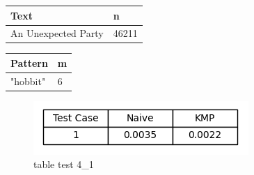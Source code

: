 \documentclass[11pt]{article}
\begin{document}
                \begin{table}[!htb]
                        \begin{minipage}{.5\linewidth}
                            \centering
                                \begin{tabular}{ll}
                                    \textbf{Text} & \textbf{n} \\
                                    \hline
                                    An Unexpected Party & 46211 \\
                                \end{tabular}
                        \end{minipage}%
                        \begin{minipage}{.5\linewidth}
                            \centering
                                \begin{tabular}{ll}
                                    \textbf{Pattern} & \textbf{m} \\
                                    \hline
                                    "hobbit" & 6 \\
                                \end{tabular}
                        \end{minipage}
                    \label{tab:test_4_1}
                \end{table}




                \begin{figure}[H]
                    \centering
                    \includegraphics[width = 0.5 \textwidth]{table_execution_times_4_1}
                    \caption{table test 4\_1}
                    \label{fig:table_test_4_1}
                \end{figure}

\end{document}
